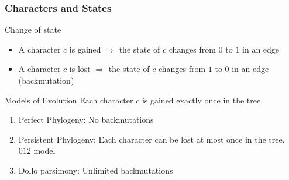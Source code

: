 






\begin{frame}
\frametitle{Characters and States}

\begin{block}{Change of state}
  \begin{itemize} 
\item  A character $c$ is \alert{gained} $\Rightarrow$  the state of $c$ changes from $0$ to $1$
  in an edge
\item  A character $c$ is \alert{lost} $\Rightarrow$  the state of $c$ changes from $1$ to $0$
  in an edge (\alert{backmutation})
\end{itemize}
\end{block}

\begin{block}{Models of Evolution}
  Each character $c$ is gained \alert{exactly once} in the tree.
\begin{enumerate}
\item
  Perfect Phylogeny:  No backmutations
\item
  Persistent Phylogeny: Each character can be lost at most once in the tree.
\alert{$012$ model}
\item
  \alert{Dollo} parsimony: 
  Unlimited backmutations
\end{enumerate}
\end{block}
\end{frame}



